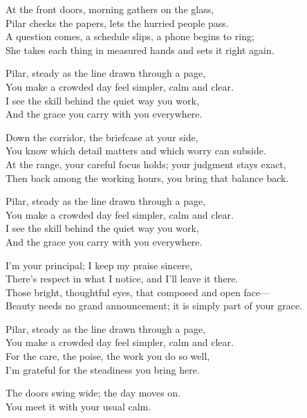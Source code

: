 \begin{lyrics}
At the front doors, morning gathers on the glass,\\
Pilar checks the papers, lets the hurried people pass.\\
A question comes, a schedule slips, a phone begins to ring;\\
She takes each thing in measured hands and sets it right again.

Pilar, steady as the line drawn through a page,\\
You make a crowded day feel simpler, calm and clear.\\
I see the skill behind the quiet way you work,\\
And the grace you carry with you everywhere.

Down the corridor, the briefcase at your side,\\
You know which detail matters and which worry can subside.\\
At the range, your careful focus holds; your judgment stays exact,\\
Then back among the working hours, you bring that balance back.

Pilar, steady as the line drawn through a page,\\
You make a crowded day feel simpler, calm and clear.\\
I see the skill behind the quiet way you work,\\
And the grace you carry with you everywhere.

I’m your principal; I keep my praise sincere,\\
There’s respect in what I notice, and I’ll leave it there.\\
Those bright, thoughtful eyes, that composed and open face—\\
Beauty needs no grand announcement; it is simply part of your grace.

Pilar, steady as the line drawn through a page,\\
You make a crowded day feel simpler, calm and clear.\\
For the care, the poise, the work you do so well,\\
I’m grateful for the steadiness you bring here.

The doors swing wide; the day moves on.\\
You meet it with your usual calm.
\end{lyrics}

